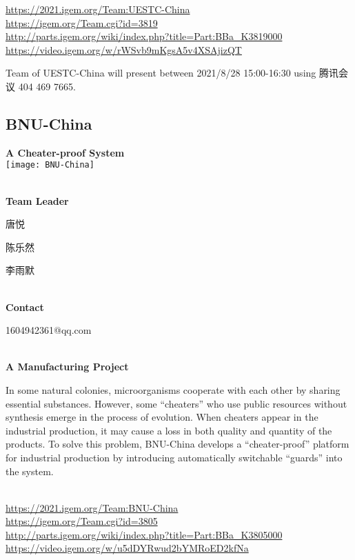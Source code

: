 \url{https://2021.igem.org/Team:UESTC-China }\\
\url{https://igem.org/Team.cgi?id=3819 }\\
\url{http://parts.igem.org/wiki/index.php?title=Part:BBa_K3819000 }\\
\url{https://video.igem.org/w/rWSvb9mKgsA5v4XSAjizQT }\\

\vfill{}









Team of UESTC-China will present between       2021/8/28 15:00-16:30  using 腾讯会议 404 469 7665.
\newpage


\subsection{\textcolor{Blu}{ BNU-China } }
\vspace{5mm}
\begin{center}
\large{
  \textbf{ A Cheater-proof System }\\
  \texttt{[image: BNU-China]}
}
\end{center}
\textbf{\\Team Leader}

  唐悦

  陈乐然

  李雨默


\textbf{\\Contact}

  1604942361@qq.com


\textbf{\\A Manufacturing Project\\}\begin{spacing}{1.5}

In some natural colonies, microorganisms cooperate with each other by sharing essential substances. However, some “cheaters” who use public resources without synthesis emerge in the process of evolution. When cheaters appear in the industrial production, it may cause a loss in both quality and quantity of the products. To solve this problem, BNU-China develops a “cheater-proof” platform for industrial production by introducing automatically switchable “guards” into the system.\end{spacing}
\\

\url{https://2021.igem.org/Team:BNU-China }\\
\url{https://igem.org/Team.cgi?id=3805 }\\
\url{http://parts.igem.org/wiki/index.php?title=Part:BBa_K3805000 }\\
\url{https://video.igem.org/w/u5dDYRwud2bYMRoED2kfNa }\\

